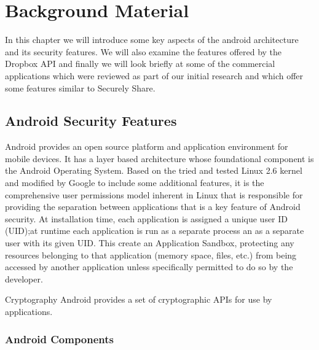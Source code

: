 
\chapter{Background Material}
\label{cha:background}

In this chapter we will introduce some key aspects of the android architecture and its security features.  We will also examine the features offered by the Dropbox API and finally we will look briefly at some of the commercial applications which were reviewed as part of our initial research and which offer some features similar to Securely Share.

\section{Android Security Features}

Android provides an open source platform and application environment for mobile devices.  It has a layer based architecture whose foundational component  is the Android Operating System.  Based on the tried and tested Linux 2.6 kernel and modified by Google to include some additional features, it is the comprehensive user permissions model inherent in Linux that is responsible for providing the separation between applications that is a key feature of Android security.  At installation time, each application is assigned a unique user ID (UID);at runtime each application is run as a separate process an as a separate user with its given UID. This create an Application Sandbox, protecting any resources belonging to that application (memory space, files, etc.) from being accessed by another application unless specifically permitted to do so by the developer.







Cryptography
Android provides a set of cryptographic APIs for use by applications. 




















\subsection{Android Components}
